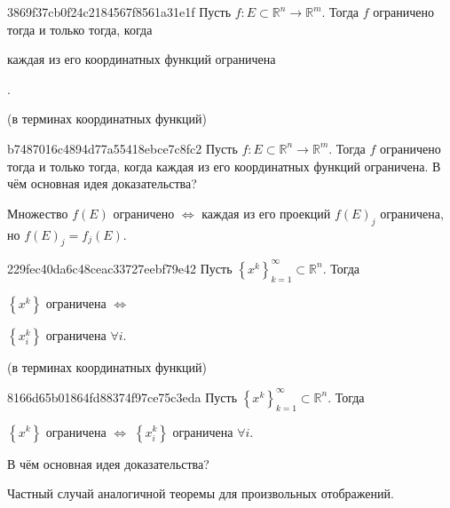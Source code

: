 \begin{note}{3869f37cb0f24c2184567f8561a31e1f}
    Пусть \({ f : E \subset \mathbb R^{n} \to \mathbb R^{m} }\).
    Тогда \({ f }\) ограничено тогда и только тогда, когда \begin{icloze}{1}каждая из его координатных функций ограничена\end{icloze}.

    \begin{center}
        \tiny
        (в терминах координатных функций)
    \end{center}
\end{note}

\begin{note}{b7487016c4894d77a55418ebce7c8fc2}
    Пусть \({ f : E \subset \mathbb R^{n} \to \mathbb R^{m} }\).
    Тогда \({ f }\) ограничено тогда и только тогда, когда каждая из его координатных функций ограничена.
    В чём основная идея доказательства?

    \begin{cloze}{1}
        Множество \({ f(E) }\) ограничено \({ \iff }\) каждая из его проекций \({ f(E)_j }\) ограничена, но \({ f(E)_j = f_j(E) }\).
    \end{cloze}
\end{note}

\begin{note}{229fec40da6c48ceac33727eebf79e42}
    Пусть \({ \left\{ x^{k} \right\}_{k = 1}^{\infty} \subset \mathbb R^{n} }\).
    Тогда
    \begin{center}
        \({ \left\{ x^{k} \right\} }\) ограничена \({ \iff }\) \begin{icloze}{1}\({ \left\{ x_i^{k} \right\} }\) ограничена \({ \forall i }\).\end{icloze}
    \end{center}

    \begin{center}
        \tiny
        (в терминах координатных функций)
    \end{center}
\end{note}

\begin{note}{8166d65b01864fd88374f97ce75c3eda}
    Пусть \({ \left\{ x^{k} \right\}_{k = 1}^{\infty} \subset \mathbb R^{n} }\).
    Тогда
    \begin{center}
        \({ \left\{ x^{k} \right\} }\) ограничена \({ \iff }\) \({ \left\{ x_i^{k} \right\} }\) ограничена \({ \forall i }\).
    \end{center}
    В чём основная идея доказательства?

    \begin{cloze}{1}
        Частный случай аналогичной теоремы для произвольных отображений.
    \end{cloze}
\end{note}

